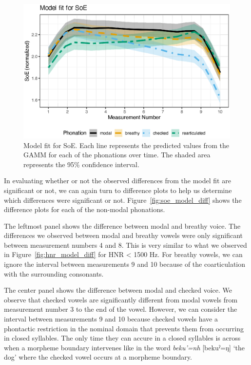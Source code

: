 \begin{figure}[h!]
    \centering
    \includegraphics[width = \linewidth]{images/LCH_GAMMs/soe_model_fit.eps}
    \caption{Model fit for SoE. Each line represents the predicted values from the GAMM for each of the phonations over time. The shaded area represents the 95\% confidence interval.}
    \label{fig:soe_model_fit}
\end{figure}

In evaluating whether or not the observed differences from the model fit are significant or not, we can again turn to difference plots to help us determine which differences were significant or not. Figure~\ref{fig:soe_model_diff} shows the difference plots for each of the non-modal phonations. 

The leftmost panel shows the difference between modal and breathy voice. The differences we observed between modal and breathy vowels were only significant between measurement numbers 4 and 8. This is very similar to what we observed in Figure~\ref{fig:hnr_model_diff} for HNR < 1500 Hz. For breathy vowels, we can ignore the interval between measurements 9 and 10 because of the coarticulation with the surrounding consonants.

The center panel shows the difference between modal and checked voice. We observe that checked vowels are significantly different from modal vowels from measurement number 3 to the end of the vowel. However, we can consider the interval between measurements 9 and 10 because checked vowels have a phontactic restriction in the nominal domain that prevents them from occurring in closed syllables. The only time they can accure in a closed syllables is across when a morpheme boundary intervenes like in the word \textit{beku'=nh} [bekuˀ=ŋ] `the dog' where the checked vowel occurs at a morpheme boundary. 

